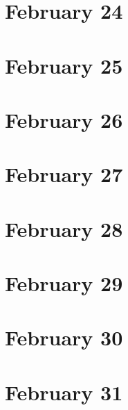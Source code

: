 \section{February 24}

\section{February 25}

\section{February 26}

\section{February 27}

\section{February 28}

\section{February 29}

\section{February 30}

\section{February 31}

